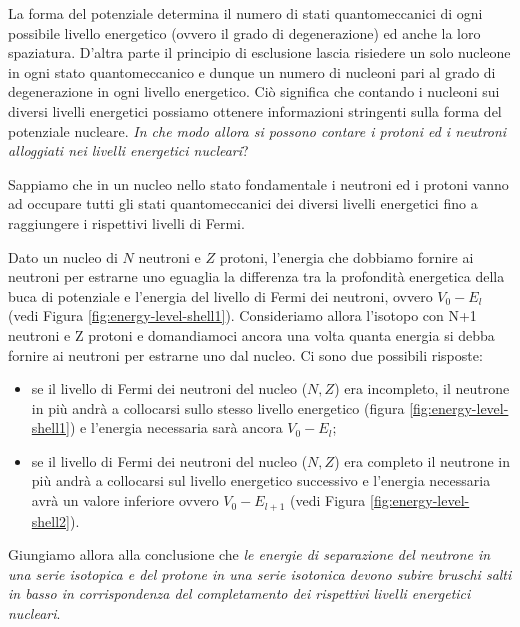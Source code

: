 La forma del potenziale determina il numero di stati quantomeccanici di ogni possibile livello energetico (ovvero il grado di degenerazione) ed anche la loro spaziatura.
D’altra parte il principio di esclusione lascia risiedere un solo nucleone in ogni stato quantomeccanico e dunque un numero di nucleoni pari al grado di degenerazione in ogni livello energetico.
Ciò significa che contando i nucleoni sui diversi livelli energetici possiamo ottenere informazioni stringenti sulla forma del potenziale nucleare. \emph{In che modo allora si possono contare i protoni ed i neutroni alloggiati nei livelli energetici nucleari}?

Sappiamo che in un nucleo nello stato fondamentale i neutroni ed i protoni vanno ad occupare tutti gli stati quantomeccanici dei diversi livelli energetici fino a raggiungere i rispettivi livelli di Fermi.

Dato un nucleo di $N$ neutroni e $Z$ protoni, l’energia che dobbiamo fornire ai neutroni per estrarne uno eguaglia la differenza tra la profondità energetica della buca di potenziale e l’energia del livello di Fermi dei neutroni, ovvero $V_{0}-E_{l}$ (vedi Figura \ref{fig:energy-level-shell1}). Consideriamo allora l’isotopo con N+1 neutroni e Z protoni e domandiamoci ancora una volta quanta energia si debba fornire ai neutroni per estrarne uno dal nucleo. Ci sono due possibili risposte:
\begin{itemize}
	\item se il livello di Fermi dei neutroni del nucleo ($N, Z$) era incompleto, il neutrone in più andrà a collocarsi sullo stesso livello energetico (figura \ref{fig:energy-level-shell1}) e l’energia necessaria sarà ancora $V_{0}-E_{l}$;
    \item se il livello di Fermi dei neutroni del nucleo ($N, Z$) era completo il neutrone in più andrà a collocarsi sul livello energetico successivo e l’energia necessaria avrà un valore inferiore ovvero $V_0 - E_{l+1}$ (vedi Figura \ref{fig:energy-level-shell2}).
\end{itemize}

Giungiamo allora alla conclusione che \emph{le energie di separazione del neutrone in una serie isotopica e del protone in una serie isotonica devono subire bruschi salti in basso in corrispondenza del completamento dei rispettivi livelli energetici nucleari}.
\bigskip

